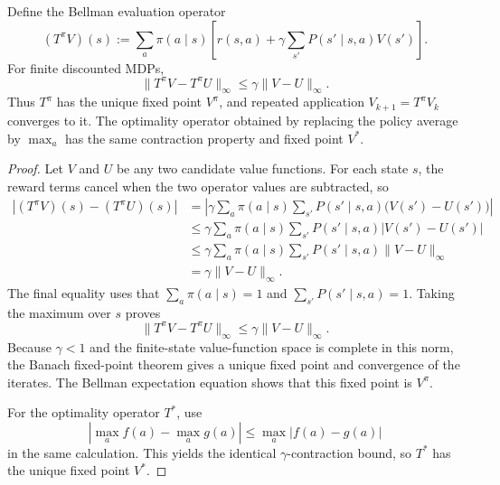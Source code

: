 \documentclass[11pt,a4paper]{article}
\theoremstyle{definition}
\begin{document}
\begin{theorem}
Define the Bellman evaluation operator
\[
(T^\pi V)(s)
:=\sum_a\pi(a\mid s)
\left[r(s,a)+\gamma\sum_{s'}P(s'\mid s,a)V(s')\right].
\]
For finite discounted MDPs,
\[
\lVert T^\pi V-T^\pi U\rVert_\infty
\leq\gamma\lVert V-U\rVert_\infty.
\]
Thus $T^\pi$ has the unique fixed point $V^\pi$, and repeated application
$V_{k+1}=T^\pi V_k$ converges to it. The optimality operator obtained by replacing the
policy average by $\max_a$ has the same contraction property and fixed point $V^*$.
\end{theorem}

\begin{proof}
Let $V$ and $U$ be any two candidate value functions. For each state $s$, the reward terms
cancel when the two operator values are subtracted, so
\[
\begin{aligned}
\left|(T^\pi V)(s)-(T^\pi U)(s)\right|
&=\left|
\gamma\sum_a\pi(a\mid s)
\sum_{s'}P(s'\mid s,a)\bigl(V(s')-U(s')\bigr)
\right|\\
&\leq
\gamma\sum_a\pi(a\mid s)
\sum_{s'}P(s'\mid s,a)\left|V(s')-U(s')\right|\\
&\leq
\gamma\sum_a\pi(a\mid s)
\sum_{s'}P(s'\mid s,a)\lVert V-U\rVert_\infty\\
&=\gamma\lVert V-U\rVert_\infty.
\end{aligned}
\]
The final equality uses that $\sum_a\pi(a\mid s)=1$ and
$\sum_{s'}P(s'\mid s,a)=1$. Taking the maximum over $s$ proves
\[
\lVert T^\pi V-T^\pi U\rVert_\infty
\leq\gamma\lVert V-U\rVert_\infty.
\]
Because $\gamma<1$ and the finite-state value-function space is complete in this norm,
the Banach fixed-point theorem gives a unique fixed point and convergence of the iterates.
The Bellman expectation equation shows that this fixed point is $V^\pi$.

For the optimality operator $T^*$, use
\[
\left|\max_a f(a)-\max_a g(a)\right|
\leq\max_a|f(a)-g(a)|
\]
in the same calculation. This yields the identical $\gamma$-contraction bound, so $T^*$ has
the unique fixed point $V^*$.
\end{proof}
\end{document}
